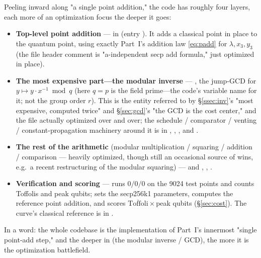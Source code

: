 \documentclass[11pt]{article}
\newcommand{\secref}[1]{\hyperref[#1]{\S\ref*{#1}}}
\begin{document}
Peeling inward along "a single point addition," the code has roughly four layers, each more of an optimization focus the deeper it goes:

\begin{itemize}[leftmargin=1.4em]
\item \textbf{Top-level point addition} ---  in  (entry
). It adds a classical point in place to the quantum point, using exactly Part~I's addition law \eqref{eq:padd} for
$\lambda,x_3,y_3$ (the file header comment is "a-independent secp add formula," just optimized in place).
\item \textbf{The most expensive part---the modular inverse} --- , the jump-GCD for $y\mapsto y\cdot x^{-1}\bmod q$ (here $q=p$ is the field prime---the code's variable name for it; not the group order $r$). This is the entity referred to by \secref{ssec:inv}'s
"most expensive, computed twice" and \secref{sec:gcd}'s "the GCD is the cost center," and the file actually optimized over and over; the schedule /
comparator / venting / constant-propagation machinery around it is in , , , and .
\item \textbf{The rest of the arithmetic} (modular multiplication / squaring / addition / comparison --- heavily optimized, though still an occasional source of wins, e.g.\ a recent restructuring of the modular squaring) ---  and ,
, .
\item \textbf{Verification and scoring} ---  runs $0/0/0$ on the 9024 test points and counts Toffolis and peak qubits;
 sets the secp256k1 parameters, computes the reference point addition, and scores $\overline{\text{Toffoli}}\times$peak qubits
(\secref{sec:cost}). The curve's classical reference is in .
\end{itemize}

In a word: the whole codebase is the implementation of Part~I's innermost "single point-add step," and the deeper in (the modular inverse / GCD), the more it is the optimization battlefield.
\end{document}

